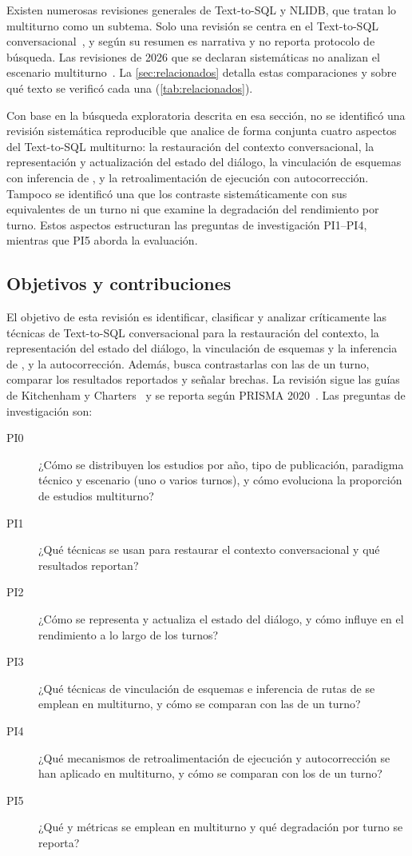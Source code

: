 Existen numerosas revisiones generales de Text-to-SQL y NLIDB, que tratan lo multiturno como un subtema. Solo una revisión se centra en el Text-to-SQL conversacional~\cite{Yang2025Conversational}, y según su resumen es narrativa y no reporta protocolo de búsqueda. Las revisiones de 2026 que se declaran sistemáticas no analizan el escenario multiturno~\cite{Liu2026NLIDBReview,Bui2026Survey}. La \cref{sec:relacionados} detalla estas comparaciones y sobre qué texto se verificó cada una (\cref{tab:relacionados}).

Con base en la búsqueda exploratoria descrita en esa sección, no se identificó una revisión sistemática reproducible que analice de forma conjunta cuatro aspectos del Text-to-SQL multiturno: la restauración del contexto conversacional, la representación y actualización del estado del diálogo, la vinculación de esquemas con inferencia de , y la retroalimentación de ejecución con autocorrección. Tampoco se identificó una que los contraste sistemáticamente con sus equivalentes de un turno ni que examine la degradación del rendimiento por turno. Estos aspectos estructuran las preguntas de investigación PI1–PI4, mientras que PI5 aborda la evaluación.

\subsection{Objetivos y contribuciones}
\label{sec:intro-objetivos}

El objetivo de esta revisión es identificar, clasificar y analizar críticamente las técnicas de Text-to-SQL conversacional para la restauración del contexto, la representación del estado del diálogo, la vinculación de esquemas y la inferencia de , y la autocorrección. Además, busca contrastarlas con las de un turno, comparar los resultados reportados y señalar brechas. La revisión sigue las guías de Kitchenham y Charters~\cite{Kitchenham2007Guidelines} y se reporta según PRISMA 2020~\cite{Page2021PRISMA}. Las preguntas de investigación son:

\begin{description}
  \item[PI0] ¿Cómo se distribuyen los estudios por año, tipo de publicación, paradigma técnico y escenario (uno o varios turnos), y cómo evoluciona la proporción de estudios multiturno?
  \item[PI1] ¿Qué técnicas se usan para restaurar el contexto conversacional y qué resultados reportan?
  \item[PI2] ¿Cómo se representa y actualiza el estado del diálogo, y cómo influye en el rendimiento a lo largo de los turnos?
  \item[PI3] ¿Qué técnicas de vinculación de esquemas e inferencia de rutas de  se emplean en multiturno, y cómo se comparan con las de un turno?
  \item[PI4] ¿Qué mecanismos de retroalimentación de ejecución y autocorrección se han aplicado en multiturno, y cómo se comparan con los de un turno?
  \item[PI5] ¿Qué  y métricas se emplean en multiturno y qué degradación por turno se reporta?
\end{description}

